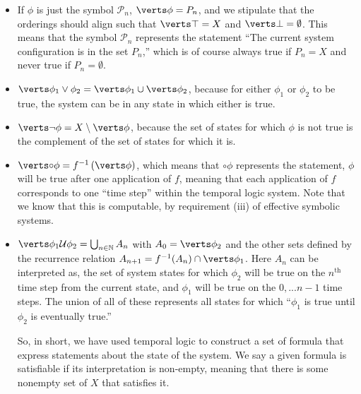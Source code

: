 \documentclass{fkpaper}
\newcommand{\lnext}{\circ}
\newcommand{\ltil}{\mathcal{U}}
\newcommand{\psc}{\mathcal{P}}
\renewcommand{\Nn}{\mathbb{N}}
\begin{document}
\begin{multicols}{2}
  \begin{itemize}
    \item If $\phi$ is just the symbol $\psc_n$, $\abs{\phi} = P_n$, and
      we stipulate that the orderings should align such that $\abs{\top}
      = X$ and $\abs{\bot} = \emptyset$. This means that the symbol
      $\psc_n$ represents the statement ``The current system
      configuration is in the set $P_n$,'' which is of course always
      true if $P_n = X$ and never true if $P_n = \emptyset$.

    \item $\abs{\phi_1 \lor \phi_2} = \abs{\phi_1} \cup \abs{\phi_2}$,
      because for either $\phi_1$ or $\phi_2$ to be true, the system can
      be in any state in which either is true.

    \item $\abs{\lnot \phi} = X \setminus \abs{\phi}$, because the set
      of states for which $\phi$ is not true is the complement of the
      set of states for which it is.

    \item $\abs{\lnext \phi} = f^{-1}\left( \abs{\phi} \right)$, which
      means that $\lnext \phi$ represents the statement, $\phi$ will be
      true after one application of $f$, meaning that each application
      of $f$ corresponds to one ``time step'' within the temporal logic
      system. Note that we know that this is computable, by requirement
      (iii) of effective symbolic systems.

    \item $\abs{\phi_1 \ltil \phi_2} = \bigcup_{n \in \Nn} A_n$ with
      $A_0 = \abs{\phi_2}$ and the other sets defined by the recurrence
      relation $A_{n+1} = f^{-1}(A_n)\cap\abs{\phi_1}$. Here $A_n$ can
      be interpreted as, the set of system states for which $\phi_2$
      will be true on the $n^{\text{th}}$ time step from the current
      state, and $\phi_1$ will be true on the $0,...n-1$ time steps. The
      union of all of these represents all states for which ``$\phi_1$
      is true until $\phi_2$ is eventually true.''

      So, in short, we have used temporal logic to construct a set of
      formula that express statements about the state of the system. We
      say a given formula is satisfiable if its interpretation is
      non-empty, meaning that there is some nonempty set of $X$ that
      satisfies it.

  \end{itemize}



\end{multicols}
\end{document}
